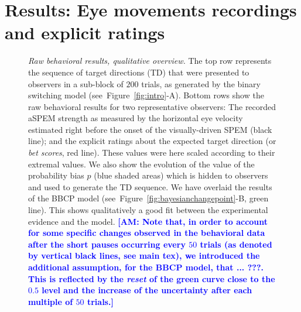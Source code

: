 \documentclass[12pt,english]{article}%
\newcommand{\seeFig}[1]{Figure~\ref{fig:#1}}
\newcommand{\AM}[1]{\textbf{\textcolor{blue}{[AM: #1]}}}
\begin{document}
\section{Results: Eye movements recordings and explicit ratings}
\label{sec:results_psycho}
\begin{figure}%
\caption{
\emph{Raw behavioral results, qualitative overview.} %
The top row represents the sequence of target directions (TD)
that were presented to observers
in a sub-block of $200$ trials,
as generated by the binary switching model (see~\seeFig{intro}-A).
Bottom rows show the raw behavioral results
for two representative observers:
The recorded aSPEM strength as measured
by the horizontal eye velocity estimated right before
the onset of the visually-driven SPEM (black line);
and the explicit ratings about the expected target direction (or \textit{bet scores}, red line).
These values were here scaled according to their extremal values.
We also show the evolution of the value
of the probability bias $p$ (blue shaded areas)
which is hidden to observers
and used to generate the TD sequence.
We have overlaid the results of the BBCP model
(see~\seeFig{bayesianchangepoint}-B, green line).
This shows qualitatively a good fit between
the experimental evidence and the model.
\AM{Note that, in order to account for some specific changes observed in the behavioral data after the short pauses occurring every $50$ trials (as denoted by vertical black lines, see main tex), we introduced the additional assumption, for the BBCP model, that ... ???. This is reflected by the \textit{reset} of the green curve close to the $0.5$ level and the increase of the uncertainty after each multiple of $50$ trials.}
}
\label{fig:results_psycho}
\end{figure}
\end{document}
